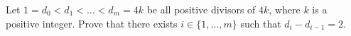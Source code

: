 Let $1 = d_0 < d_1 < \dots < d_m = 4k$ be all positive divisors of $4k$,  where $k$ is a positive integer. Prove that there exists $i \in \{1, \dots, m\}$ such that $d_i - d_{i-1} = 2$.
